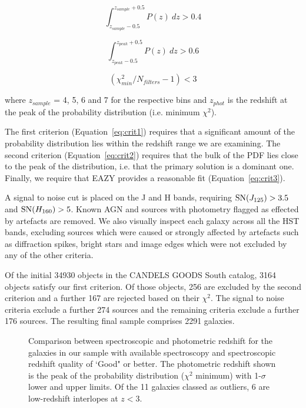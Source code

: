 
\begin{equation}\label{eq:crit1}
\int_{z_{sample}-0.5}^{z_{sample}+0.5} P(z)~dz > 0.4
\end{equation}

\begin{equation}\label{eq:crit2}
\int_{z_{peak}-0.5}^{z_{peak}+0.5} P(z)~dz > 0.6
\end{equation}
 
\begin{equation}\label{eq:crit3}
(\chi^{2}_{min} /N_{filters}-1) < 3
\end{equation}

\noindent where $z_{sample}$ = 4, 5, 6 and 7 for the respective bins and $z_{phot}$ is the redshift at the peak of the probability distribution (i.e. minimum $\chi^2$). 

The first criterion (Equation~\ref{eq:crit1}) requires that a significant amount of the probability distribution lies within the redshift range we are examining. The second criterion (Equation~\ref{eq:crit2}) requires that the bulk of the PDF lies close to the peak of the distribution, i.e. that the primary solution is a dominant one. Finally, we require that EAZY provides a reasonable fit (Equation~\ref{eq:crit3}). 

A signal to noise cut is placed on the J and H bands, requiring $\textup{SN}(J_{125}) > 3.5$ and $\textup{SN}(H_{160}) > 5$. Known AGN and sources with photometry flagged as effected by artefacts are removed. We also visually inspect each galaxy across all the HST bands, excluding sources which were caused or strongly affected by artefacts such as diffraction spikes, bright stars and image edges which were not excluded by any of the other criteria. 

Of the initial 34930 objects in the CANDELS GOODS South catalog, 3164 objects satisfy our first criterion. Of those objects, 256 are excluded by the second criterion and a further 167 are rejected based on their $\chi^{2}$. The signal to noise criteria exclude a further 274 sources and the remaining criteria exclude a further 176 sources. The resulting final sample comprises 2291 galaxies.

\begin{figure}
\caption{Comparison between spectroscopic and photometric redshift for the galaxies in our sample with available spectroscopy and spectroscopic redshift quality of `Good" or better. The photometric redshift shown is the peak of the probability distribution ($\chi^2$ minimum) with 1-$\sigma$ lower and upper limits. Of the 11 galaxies classed as outliers, 6 are low-redshift interlopes at $z < 3$.}
\label{fig:specz}
\end{figure}

